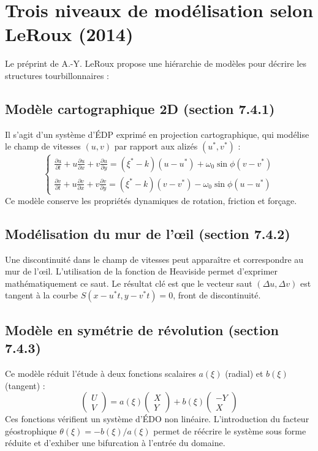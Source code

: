 \section{Trois niveaux de mod\'elisation selon LeRoux (2014)}

Le pr\'eprint de A.-Y. LeRoux \cite{leroux2014modelisation} propose une hi\'erarchie de mod\`eles pour d\'ecrire les structures tourbillonnaires :

\subsection{Mod\`ele cartographique 2D (section 7.4.1)}

Il s'agit d'un syst\`eme d'\'EDP exprim\'e en projection cartographique, qui mod\'elise le champ de vitesses $(u,v)$ par rapport aux aliz\'es $(u^*,v^*)$ :
\[
\begin{cases}
\frac{\partial u}{\partial t} + u\frac{\partial u}{\partial x} + v\frac{\partial u}{\partial y} = (\xi^* - k)(u - u^*) + \omega_0 \sin\phi (v - v^*) \\
\frac{\partial v}{\partial t} + u\frac{\partial v}{\partial x} + v\frac{\partial v}{\partial y} = (\xi^* - k)(v - v^*) - \omega_0 \sin\phi (u - u^*)
\end{cases}
\]
Ce mod\`ele conserve les propri\'et\'es dynamiques de rotation, friction et for\c{c}age.

\subsection{Mod\'elisation du mur de l'\oe il (section 7.4.2)}

Une discontinuit\'e dans le champ de vitesses peut appara\^itre et correspondre au mur de l'\oe il. L'utilisation de la fonction de Heaviside permet d'exprimer math\'ematiquement ce saut. Le r\'esultat cl\'e est que le vecteur saut $(\Delta u, \Delta v)$ est tangent \`a la courbe $S(x - u^*t, y - v^*t) = 0$, front de discontinuit\'e.

\subsection{Mod\`ele en sym\'etrie de r\'evolution (section 7.4.3)}

Ce mod\`ele r\'eduit l'\'etude \`a deux fonctions scalaires $a(\xi)$ (radial) et $b(\xi)$ (tangent) :
\[
\begin{pmatrix}
U \\
V
\end{pmatrix}
= a(\xi)
\begin{pmatrix}
X \\
Y
\end{pmatrix}
+ b(\xi)
\begin{pmatrix}
- Y \\
X
\end{pmatrix}
\]
Ces fonctions v\'erifient un syst\`eme d'\'EDO non lin\'eaire. L'introduction du facteur g\'eostrophique $\theta(\xi) = -b(\xi)/a(\xi)$ permet de r\'e\'ecrire le syst\`eme sous forme r\'eduite et d'exhiber une bifurcation \`a l'entr\'ee du domaine.

